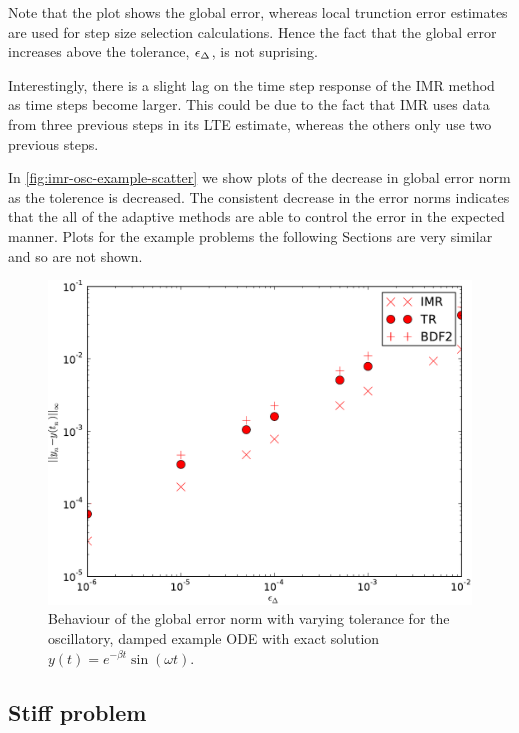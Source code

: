 Note that the plot shows the global error, whereas local trunction error estimates are used for step size selection calculations.
Hence the fact that the global error increases above the tolerance, $\epsilon_{\Delta_{}}$, is not suprising.

Interestingly, there is a slight lag on the time step response of the IMR method as time steps become larger.
This could be due to the fact that IMR uses data from three previous steps in its LTE estimate, whereas the others only use two previous steps.

In \autoref{fig:imr-osc-example-scatter} we show plots of the decrease in global error norm as the tolerence is decreased. 
The consistent decrease in the error norms indicates that the all of the adaptive methods are able to control the error in the expected manner.
Plots for the example problems the following Sections are very similar and so are not shown.

\begin{figure}[\figpos]
  \centering \includegraphics[width=1\textwidth]{plots/aimr_odes/damped_oscillation-maxoferrornormsvs-tol}
  \caption{Behaviour of the global error norm with varying tolerance for the oscillatory, damped example ODE with exact solution $y(t) = e^{-\beta t} \sin(\omega t)$.}
  \label{fig:imr-osc-example-scatter}
\end{figure}

\subsection{Stiff problem}
\label{sec:imr-stiff-example}

